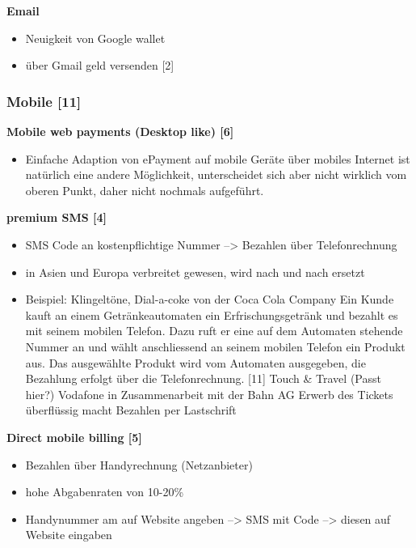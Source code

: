 \textbf{ Email}\\
	\begin{itemize}
	\item Neuigkeit von Google wallet
	\item über Gmail geld versenden [2]
	\end{itemize}


\subsubsection{ Mobile [11]}
\textbf{ Mobile web payments (Desktop like) [6]}\\
	\begin{itemize}
	\item Einfache Adaption von ePayment auf mobile Geräte über mobiles Internet ist natürlich eine andere Möglichkeit, unterscheidet sich aber nicht wirklich vom oberen Punkt, daher nicht nochmals aufgeführt.
	\end{itemize}

\textbf{ premium SMS [4]}\\
	\begin{itemize}
	\item SMS Code an kostenpflichtige Nummer --> Bezahlen über Telefonrechnung
	\item in Asien und Europa verbreitet gewesen, wird nach und nach ersetzt
	\item Beispiel: 
	\subitem  Klingeltöne, 
	\subitem  Dial-a-coke von der Coca Cola Company
		\subitem  Ein Kunde kauft an einem Getränkeautomaten ein Erfrischungsgetränk und bezahlt es mit seinem mobilen Telefon. Dazu ruft er eine auf dem Automaten stehende Nummer an und wählt anschliessend an seinem mobilen Telefon ein Produkt aus. Das ausgewählte Produkt wird vom Automaten ausgegeben, die Bezahlung erfolgt über die Telefonrechnung. [11]
	\subitem  Touch \& Travel (Passt hier?)
		\subitem  Vodafone in Zusammenarbeit mit der Bahn AG
		\subitem  Erwerb des Tickets überflüssig macht
		\subitem  Bezahlen per Lastschrift
	\end{itemize}
		
		
\textbf{ Direct mobile billing [5]}\\
	\begin{itemize}
	\item Bezahlen über Handyrechnung (Netzanbieter)
	\item hohe Abgabenraten von 10-20\%
	\item Handynummer am auf Website angeben --> SMS mit Code --> diesen auf Website eingaben
	\end{itemize}


